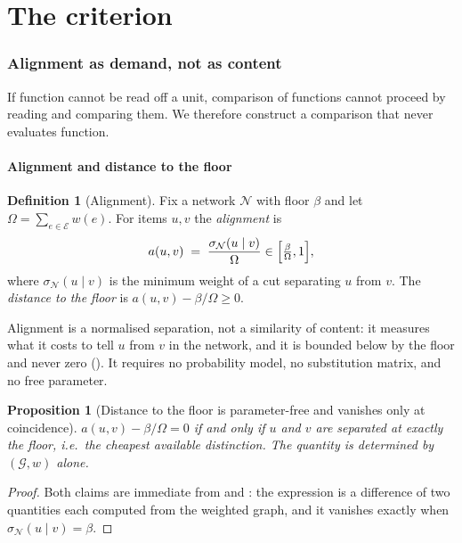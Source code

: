 \documentclass[11pt,twocolumn,a4paper]{article}
\newtheorem{proposition}[theorem]{Proposition}
\theoremstyle{definition}
\newtheorem{definition}[theorem]{Definition}
\theoremstyle{remark}
\newcommand{\Gph}{\mathcal{G}}
\newcommand{\E}{\mathcal{E}}
\newcommand{\wt}{w}
\newcommand{\flo}{\beta}
\newcommand{\sep}{\sigma}
\newcommand{\al}{a}
\newcommand{\netw}{\mathcal{N}}
\begin{document}
\part{The criterion}

\section{Alignment as demand, not as content}
\label{sec:relaxation}

If function cannot be read off a unit, comparison of functions cannot
proceed by reading and comparing them. We therefore construct a comparison
that never evaluates function.

\subsection{Alignment and distance to the floor}

\begin{definition}[Alignment]
\label{def:alignment}
Fix a network $\netw$ with floor $\flo$ and let $\Omega=\sum_{e\in\E}
\wt(e)$. For items $u,v$ the \emph{alignment} is
\[
  \al(u,v)\;=\;\frac{\sep_{\netw}(u\mid v)}{\Omega}\in\Bigl[\tfrac{\flo}{\Omega},1\Bigr],
\]
where $\sep_\netw(u\mid v)$ is the minimum weight of a cut separating $u$
from $v$. The \emph{distance to the floor} is
$\al(u,v)-\flo/\Omega\ge0$.
\end{definition}

Alignment is a normalised separation, not a similarity of content: it
measures what it costs to tell $u$ from $v$ in the network, and it is
bounded below by the floor and never zero (). It requires
no probability model, no substitution matrix, and no free parameter.

\begin{proposition}[Distance to the floor is parameter-free and vanishes only at coincidence]
\label{prop:d2f}
$\al(u,v)-\flo/\Omega=0$ if and only if $u$ and $v$ are separated at
exactly the floor, i.e.\ the cheapest available distinction. The quantity
is determined by $(\Gph,\wt)$ alone.
\end{proposition}

\begin{proof}
Both claims are immediate from  and
: the expression is a difference of two quantities each
computed from the weighted graph, and it vanishes exactly when
$\sep_\netw(u\mid v)=\flo$.
\end{proof}
\end{document}
